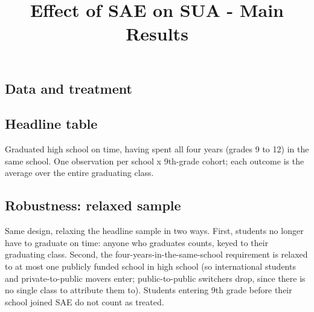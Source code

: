 \documentclass[
]{article}
\title{Effect of SAE on SUA - Main Results}
\author{}
\date{\vspace{-2.5em}}
\begin{document}
\maketitle

\hypertarget{data-and-treatment}{%
\subsection{Data and treatment}\label{data-and-treatment}}

\hypertarget{headline-table}{%
\subsection{Headline table}\label{headline-table}}

Graduated high school on time, having spent all four years (grades 9 to
12) in the same school. One observation per school x 9th-grade cohort;
each outcome is the average over the entire graduating class.

\begin{table}[htbp]
   \caption{ Regression Results}\label{tab: main results}
   \centerline{}
\end{table}

\hypertarget{robustness-relaxed-sample}{%
\subsection{Robustness: relaxed
sample}\label{robustness-relaxed-sample}}

Same design, relaxing the headline sample in two ways. First, students
no longer have to graduate on time: anyone who graduates counts, keyed
to their graduating class. Second, the four-years-in-the-same-school
requirement is relaxed to at most one publicly funded school in high
school (so international students and private-to-public movers enter;
public-to-public switchers drop, since there is no single class to
attribute them to). Students entering 9th grade before their school
joined SAE do not count as treated.
\end{document}
